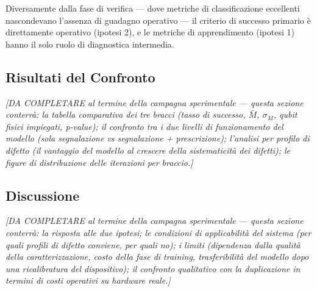 \begin{onehalfspace}
Diversamente dalla fase di verifica --- dove metriche di classificazione eccellenti nascondevano l'assenza di guadagno operativo --- il criterio di successo primario è direttamente operativo (ipotesi 2), e le metriche di apprendimento (ipotesi 1) hanno il solo ruolo di diagnostica intermedia.

\subsection{Risultati del Confronto}
\label{subsec:risultati_predizione}

\textit{[DA COMPLETARE al termine della campagna sperimentale --- questa sezione conterrà: la tabella comparativa dei tre bracci (tasso di successo, $\bar{M}$, $\sigma_M$, qubit fisici impiegati, p-value); il confronto tra i due livelli di funzionamento del modello (sola segnalazione vs segnalazione + prescrizione); l'analisi per profilo di difetto (il vantaggio del modello al crescere della sistematicità dei difetti); le figure di distribuzione delle iterazioni per braccio.]}

\subsection{Discussione}
\label{subsec:discussione_predizione}

\textit{[DA COMPLETARE al termine della campagna sperimentale --- questa sezione conterrà: la risposta alle due ipotesi; le condizioni di applicabilità del sistema (per quali profili di difetto conviene, per quali no); i limiti (dipendenza dalla qualità della caratterizzazione, costo della fase di training, trasferibilità del modello dopo una ricalibratura del dispositivo); il confronto qualitativo con la duplicazione in termini di costi operativi su hardware reale.]}

\end{onehalfspace}
